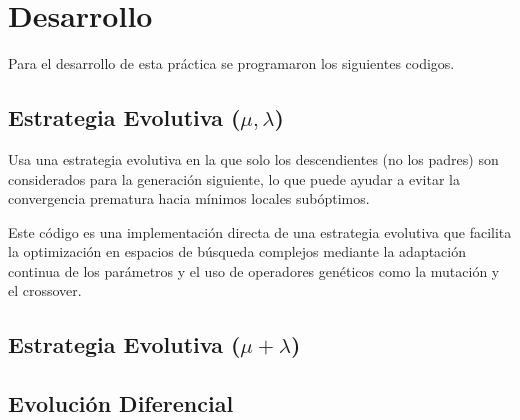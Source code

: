 \documentclass{report}
\begin{document}
\section{Desarrollo}
Para el desarrollo de esta práctica se programaron los siguientes codigos.
\subsection{Estrategia Evolutiva ($\mu , \lambda$)}
Usa una estrategia evolutiva en la que solo los descendientes (no los padres) son considerados para la generación siguiente, lo que puede ayudar a evitar la convergencia prematura hacia mínimos locales subóptimos.

Este código es una implementación directa de una estrategia evolutiva que facilita la optimización en espacios de búsqueda complejos mediante la adaptación continua de los parámetros y el uso de operadores genéticos como la mutación y el crossover.
\subsection{Estrategia Evolutiva ($\mu + \lambda$)}


\subsection{Evolución Diferencial}

\end{document}
